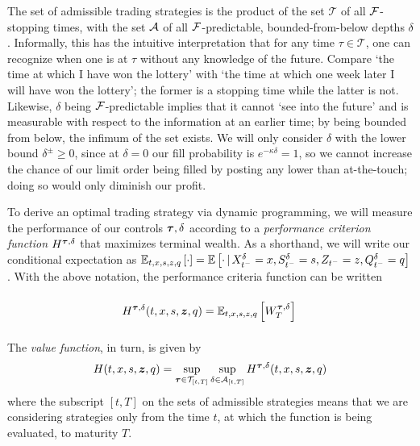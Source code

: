 The set of admissible trading strategies is the product of the set $\mathcal{T}$ of all $\mathcal{F}$-stopping times, with the set $\mathcal{A}$ of all $\mathcal{F}$-predictable, bounded-from-below depths $\delta$. Informally, this has the intuitive interpretation that for any time $\tau \in \mathcal{T}$, one can recognize when one is at $\tau$ without any knowledge of the future. Compare `the time at which I have won the lottery' with `the time at which one week later I will have won the lottery'; the former is a stopping time while the latter is not. 
Likewise, $\delta$ being $\mathcal{F}$-predictable implies that it cannot `see into the future' and is measurable with respect to the information at an earlier time; by being bounded from below, the infimum of the set exists. We will only consider $\delta$ with the lower bound $\delta^\pm \geq 0$, since at $\delta=0$ our fill probability is $e^{-\kappa\delta}=1$, so we cannot increase the chance of our limit order being filled by posting any lower than at-the-touch; doing so would only diminish our profit.

To derive an optimal trading strategy via dynamic programming, we will measure the performance of our controls ${\bm{\tau}, \delta}$ according to a \emph{performance criterion function} $H^{\bm{\tau}, \delta}$ that maximizes terminal wealth. As a shorthand, we will write our conditional expectation as $\mathbb{E}_{t,x,s,z,q} \left[ \cdot \right] = \mathbb{E} \left[ \cdot \, | \, X_{t^-}^\delta = x, S_{t^-}^\delta = s, Z_{t^-} = z, Q_{t^-}^\delta = q \right]$. With the above notation, the performance criteria function can be written 
\begin{equation}\label{eq:performancecriteria}
H^{\bm{\tau}, \delta}(t,x,s,\bm{z},q) = \mathbb{E}_{t,x,s,z,q} \left[ W_T^{\bm{\tau}, \delta} \right]\vphantom{\int\limits_t^T}
\end{equation}
The \emph{value function}, in turn, is given by
\begin{equation}\label{eq:valuefunction}
H(t,x,s,\bm{z},q) = \sup\limits_{\bm{\tau} \in \mathcal{T}_{[t,T]}} \sup\limits_{\delta \in \mathcal{A}_{[t,T]}} H^{\bm{\tau}, \delta}(t,x,s,\bm{z},q)
\end{equation}
where the subscript $[t,T]$ on the sets of admissible strategies means that we are considering strategies only from the time $t$, at which the function is being evaluated, to maturity $T$.

